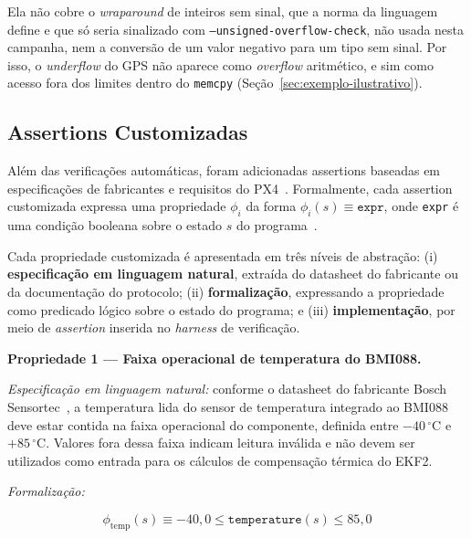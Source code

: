 Ela não cobre o \textit{wraparound} de inteiros sem sinal, que a norma da
linguagem define e que só seria sinalizado com \texttt{--unsigned-overflow-check},
não usada nesta campanha, nem a conversão de um valor negativo para um tipo sem
sinal. Por isso, o \textit{underflow} do GPS não aparece como
\textit{overflow} aritmético, e sim como acesso fora dos limites dentro do
\texttt{memcpy} (Seção~\ref{sec:exemplo-ilustrativo}).

\subsection{Assertions Customizadas}

Além das verificações automáticas, foram adicionadas assertions baseadas em
especificações de fabricantes e requisitos do PX4~\cite{PX4_Documentation}.
Formalmente, cada assertion customizada expressa uma propriedade
$\phi_i$ da forma $\phi_i(s) \equiv \texttt{expr}$, onde \texttt{expr} é uma
condição booleana sobre o estado $s$ do programa~\cite{Cordeiro2012}.

Cada propriedade customizada é apresentada em três níveis de abstração: (i) \textbf{especificação em linguagem natural}, extraída do datasheet do fabricante ou da documentação do protocolo; (ii) \textbf{formalização}, expressando a propriedade como predicado lógico sobre o estado do programa; e (iii) \textbf{implementação}, por meio de \textit{assertion} inserida no \textit{harness} de verificação.

\textbf{Propriedade 1 --- Faixa operacional de temperatura do BMI088.}

\textit{Especificação em linguagem natural:} conforme o datasheet do fabricante Bosch Sensortec~\cite{Bosch2021}, a temperatura lida do sensor de temperatura integrado ao BMI088 deve estar contida na faixa operacional do componente, definida entre $-40\,^{\circ}$C e $+85\,^{\circ}$C. Valores fora dessa faixa indicam leitura inválida e não devem ser utilizados como entrada para os cálculos de compensação térmica do EKF2.

\textit{Formalização:}

\begin{equation}
\phi_{\text{temp}}(s) \equiv -40{,}0 \leq \texttt{temperature}(s) \leq 85{,}0
\label{eq:prop_temp}
\end{equation}

